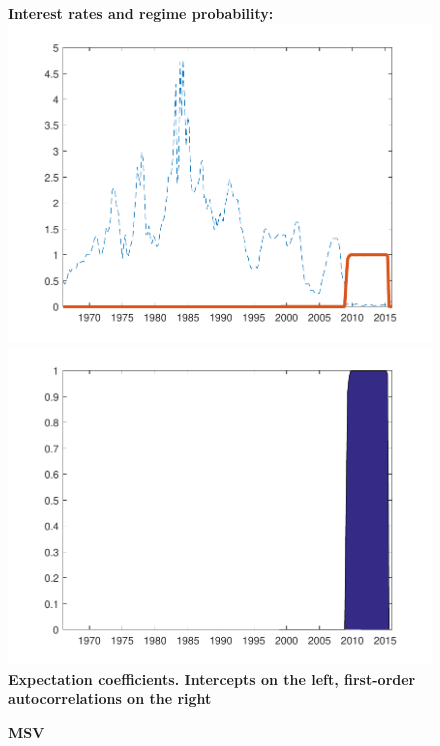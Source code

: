 \documentclass[12pt,reqno]{article}
\numberwithin{equation}{section}
\begin{document}
\begin{figure}[H]
\caption{\large{\textbf{MSV}}}
\vspace{5 mm}

\textbf{Interest rates and regime probability:} \\

\includegraphics[scale=0.6]{NKPC_filter_init_MSV_regime.pdf}
\includegraphics[scale=0.6]{NKPC_filter_init_MSV_regimeProb.pdf}\\

\textbf{Expectation coefficients. Intercepts on the left, first-order autocorrelations on the right}\\


\end{figure}
\end{document}
